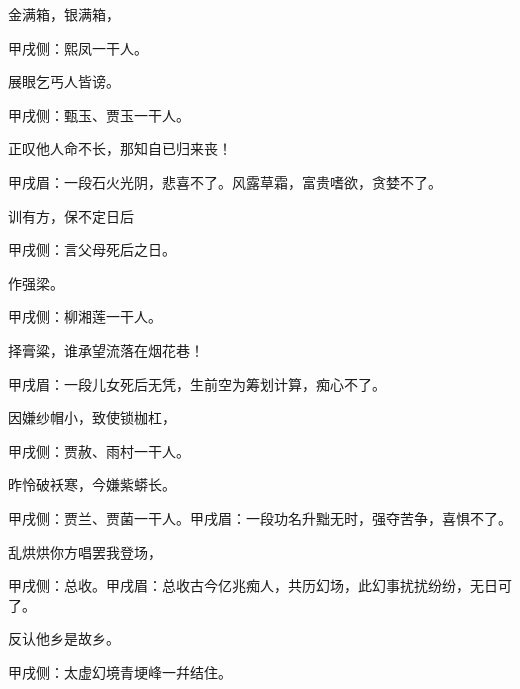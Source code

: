 \begin{poem}
    \begin{pl}金满箱，银满箱，\end{pl}\begin{note}甲戌侧：熙凤一干人。\end{note}

    \begin{pl}展眼乞丐人皆谤。\end{pl}\begin{note}甲戌侧：甄玉、贾玉一干人。\end{note}

    \begin{pl}正叹他人命不长，那知自已归来丧！\end{pl}\begin{note}甲戌眉：一段石火光阴，悲喜不了。风露草霜，富贵嗜欲，贪婪不了。\end{note}

    \begin{pl}训有方，保不定日后\end{pl}\begin{note}甲戌侧：言父母死后之日。\end{note}作强梁。\begin{note}甲戌侧：柳湘莲一干人。\end{note}

    \begin{pl}择膏粱，谁承望流落在烟花巷！\end{pl}\begin{note}甲戌眉：一段儿女死后无凭，生前空为筹划计算，痴心不了。\end{note}

    \begin{pl}因嫌纱帽小，致使锁枷杠，\end{pl}\begin{note}甲戌侧：贾赦、雨村一干人。\end{note}

    \begin{pl}昨怜破袄寒，今嫌紫蟒长。\end{pl}\begin{note}甲戌侧：贾兰、贾菌一干人。甲戌眉：一段功名升黜无时，强夺苦争，喜惧不了。\end{note}
    \begin{pl}乱烘烘你方唱罢我登场，\end{pl}\begin{note}甲戌侧：总收。甲戌眉：总收古今亿兆痴人，共历幻场，此幻事扰扰纷纷，无日可了。\end{note}

    \begin{pl}反认他乡是故乡。\end{pl}\begin{note}甲戌侧：太虚幻境青埂峰一幷结住。\end{note}


\end{poem}
